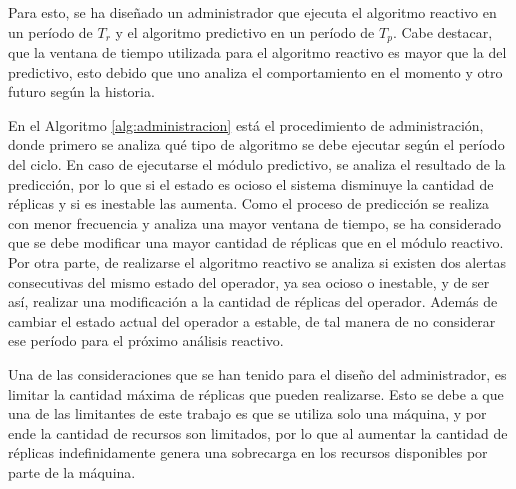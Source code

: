 \normalsize{Para esto, se ha diseñado un administrador que ejecuta el algoritmo reactivo en un período de $T_r$ y el algoritmo predictivo en un período de $T_p$. Cabe destacar, que la ventana de tiempo utilizada para el algoritmo reactivo es mayor que la del predictivo, esto debido que uno analiza el comportamiento en el momento y otro futuro según la historia.}

En el Algoritmo \ref{alg:administracion} está el procedimiento de administración, donde primero se analiza qué tipo de algoritmo se debe ejecutar según el período del ciclo. En caso de ejecutarse el módulo predictivo, se analiza el resultado de la predicción, por lo que si el estado es ocioso el sistema disminuye la cantidad de réplicas y si es inestable las aumenta. Como el proceso de predicción se realiza con menor frecuencia y analiza una mayor ventana de tiempo, se ha considerado que se debe modificar una mayor cantidad de réplicas que en el módulo reactivo. Por otra parte, de realizarse el algoritmo reactivo se analiza si existen dos alertas consecutivas del mismo estado del operador, ya sea ocioso o inestable, y de ser así, realizar una modificación a la cantidad de réplicas del operador. Además de cambiar el estado actual del operador a estable, de tal manera de no considerar ese período para el próximo análisis reactivo.

Una de las consideraciones que se han tenido para el diseño del administrador, es limitar la cantidad máxima de réplicas que pueden realizarse. Esto se debe a que una de las limitantes de este trabajo es que se utiliza solo una máquina, y por ende la cantidad de recursos son limitados, por lo que al aumentar la cantidad de réplicas indefinidamente genera una sobrecarga en los recursos disponibles por parte de la máquina.

\clearpage


